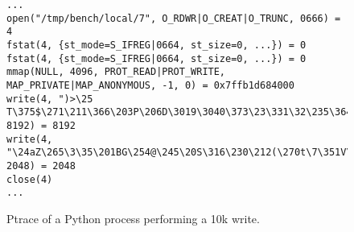 \begin{figure}[!h]
\begin{lstlisting}
...
open("/tmp/bench/local/7", O_RDWR|O_CREAT|O_TRUNC, 0666) = 4
fstat(4, {st_mode=S_IFREG|0664, st_size=0, ...}) = 0
fstat(4, {st_mode=S_IFREG|0664, st_size=0, ...}) = 0
mmap(NULL, 4096, PROT_READ|PROT_WRITE, MAP_PRIVATE|MAP_ANONYMOUS, -1, 0) = 0x7ffb1d684000
write(4, ")>\25 T\375$\271\211\366\203P\206D\3019\3040\373\23\331\32\235\364F\267\22m\vf\321\256"..., 8192) = 8192
write(4, "\24aZ\265\3\35\201BG\254@\245\20S\316\230\212(\270t\7\351V\375\267jI\30\215\355\275\4"..., 2048) = 2048
close(4)  
...
\end{lstlisting}
\caption[Python Write Ptrace]{Ptrace of a Python process performing a 10k write.}
\label{fig:writeptrace}
\end{figure}